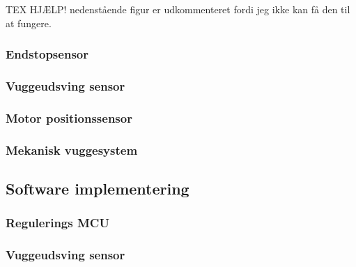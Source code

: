 TEX HJÆLP! nedenstående figur er udkommenteret fordi jeg ikke kan få den til at fungere.


\subsubsection{Endstopsensor}

\subsubsection{Vuggeudsving sensor}

\subsubsection{Motor positionssensor}

\subsubsection{Mekanisk vuggesystem}


\subsection{Software implementering}
\subsubsection{Regulerings MCU}
\subsubsection{Vuggeudsving sensor}
